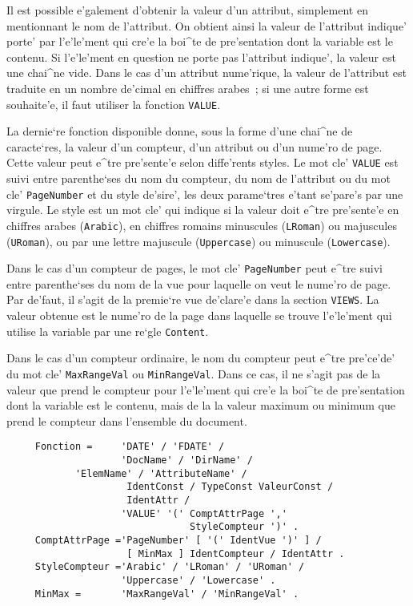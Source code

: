 {Il est possible e'galement d'obtenir la valeur d'un attribut, simplement
en mentionnant le nom de l'attribut. On obtient ainsi la valeur de l'attribut
indique' porte' par l'e'le'ment qui cre'e la boi^te de pre'sentation dont
la variable est le contenu. Si l'e'le'ment en question ne porte pas l'attribut
indique', la valeur est une chai^ne vide. Dans le cas d'un attribut
nume'rique, la valeur de l'attribut est traduite en un nombre de'cimal en
chiffres arabes~; si une autre forme est souhaite'e, il faut utiliser la
fonction {\tt VALUE}.

La dernie`re fonction disponible donne, sous la forme d'une chai^ne de
caracte`res, la valeur d'un compteur, d'un attribut ou d'un nume'ro de page.
Cette valeur peut e^tre pre'sente'e selon diffe'rents styles.
Le mot cle' {\tt VALUE} est suivi entre parenthe`ses du nom du compteur, du
nom de l'attribut ou du mot cle' {\tt PageNumber} et du style de'sire',
les deux parame`tres e'tant se'pare's par une virgule. Le style
est un mot cle' qui indique si la valeur doit e^tre pre'sente'e
en chiffres arabes ({\tt Arabic}), en chiffres romains minuscules
({\tt LRoman}) ou majuscules ({\tt URoman}), ou par une lettre majuscule
({\tt Uppercase}) ou minuscule ({\tt Lowercase}).

Dans le cas d'un compteur de pages, le mot cle' {\tt PageNumber} peut
e^tre suivi entre parenthe`ses du nom de la vue pour laquelle on veut
le nume'ro de page. Par de'faut, il s'agit de la premie`re vue de'clare'e
dans la section {\tt VIEWS}. La valeur obtenue est le nume'ro de la page
dans laquelle se trouve l'e'le'ment qui utilise la variable par une re`gle
{\tt Content}.

Dans le cas d'un compteur ordinaire, le nom du compteur peut e^tre pre'ce'de'
du mot cle' {\tt MaxRangeVal} ou {\tt MinRangeVal}. Dans ce cas,
il ne s'agit pas de la valeur que prend le compteur pour l'e'le'ment
qui cre'e la boi^te de pre'sentation dont la variable est le contenu,
mais de la la valeur maximum ou minimum que prend le compteur dans
l'ensemble du document.

\begin{verbatim}
     Fonction =     'DATE' / 'FDATE' /
                    'DocName' / 'DirName' /
		    'ElemName' / 'AttributeName' /
                     IdentConst / TypeConst ValeurConst /
                     IdentAttr /
                    'VALUE' '(' ComptAttrPage ','
                                StyleCompteur ')' .
     ComptAttrPage ='PageNumber' [ '(' IdentVue ')' ] /
                     [ MinMax ] IdentCompteur / IdentAttr .
     StyleCompteur ='Arabic' / 'LRoman' / 'URoman' /
                    'Uppercase' / 'Lowercase' .
     MinMax =       'MaxRangeVal' / 'MinRangeVal' .
\end{verbatim}

}
